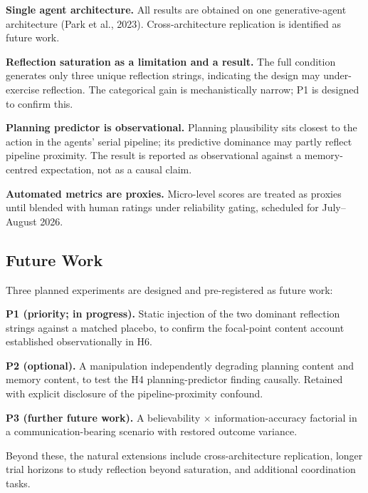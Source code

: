 \documentclass[11pt]{article}
\begin{document}
\textbf{Single agent architecture.} All results are obtained on one generative-agent architecture (Park et al., 2023). Cross-architecture replication is identified as future work.

\textbf{Reflection saturation as a limitation and a result.} The full condition generates only three unique reflection strings, indicating the design may under-exercise reflection. The categorical gain is mechanistically narrow; P1 is designed to confirm this.

\textbf{Planning predictor is observational.} Planning plausibility sits closest to the action in the agents' serial pipeline; its predictive dominance may partly reflect pipeline proximity. The result is reported as observational against a memory-centred expectation, not as a causal claim.

\textbf{Automated metrics are proxies.} Micro-level scores are treated as proxies until blended with human ratings under reliability gating, scheduled for July--August 2026.

\subsection{Future Work}

Three planned experiments are designed and pre-registered as future work:

\textbf{P1 (priority; in progress).} Static injection of the two dominant reflection strings against a matched placebo, to confirm the focal-point content account established observationally in H6.

\textbf{P2 (optional).} A manipulation independently degrading planning content and memory content, to test the H4 planning-predictor finding causally. Retained with explicit disclosure of the pipeline-proximity confound.

\textbf{P3 (further future work).} A believability $\times$ information-accuracy factorial in a communication-bearing scenario with restored outcome variance.

\noindent Beyond these, the natural extensions include cross-architecture replication, longer trial horizons to study reflection beyond saturation, and additional coordination tasks.
\end{document}

